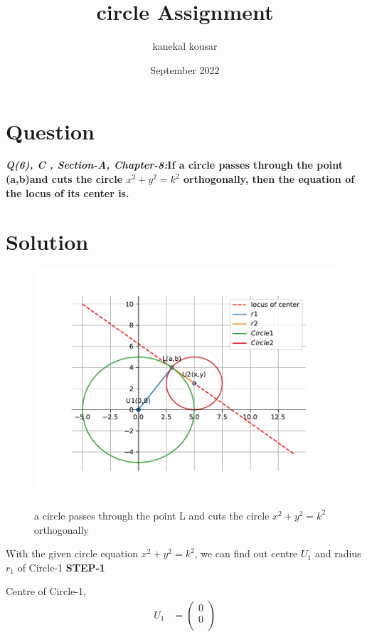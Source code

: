 \documentclass[journal,12pt,twocolumn]{IEEEtran}
\title{\textbf{\\circle Assignment}}
\author{kanekal kousar}
\date{September 2022}
\begin{document}
\maketitle


\section{Question}
\textbf{\textit{Q(6), C , Section-A, Chapter-8:}If a circle passes through the point (a,b)and cuts the circle {$x^2+y^2=k^2$} orthogonally, then the equation of the locus of its center is.}

\section{Solution}
\raggedright 

\begin{figure}[h!]
\centering
\includegraphics[scale=0.5]{fig/cir.pdf} \\
\caption{a circle passes through the point L and cuts the circle {$x^2+y^2=k^2$} orthogonally}
\end{figure}

\vspace{0.25cm}
With the given circle equation {$x^2+y^2=k^2$}, we can find out centre \(U_1\) and radius \(r_1\) of Circle-1
\vspace{0.25cm}
\textbf{STEP-1}

Centre of Circle-1,
\boldmath 
\begin{align} 
U_1 &= \begin{pmatrix}0 \\ 0 \\ \end{pmatrix} 
\end{align}
\unboldmath
\end{document}
